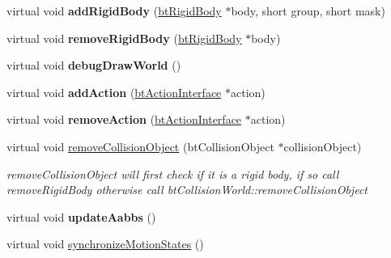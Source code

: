 \begin{DoxyCompactItemize}
\item 
\mbox{\label{classbtSimpleDynamicsWorld_a9ea7739dd5c2b5f5f114440b0741ed43}} 
virtual void {\bfseries add\+Rigid\+Body} (\hyperlink{classbtRigidBody}{bt\+Rigid\+Body} $\ast$body, short group, short mask)
\item 
\mbox{\label{classbtSimpleDynamicsWorld_ab6034d6e27ccee6a279e695d87586795}} 
virtual void {\bfseries remove\+Rigid\+Body} (\hyperlink{classbtRigidBody}{bt\+Rigid\+Body} $\ast$body)
\item 
\mbox{\label{classbtSimpleDynamicsWorld_aa9a10982644f81b5a8a27420611ba41a}} 
virtual void {\bfseries debug\+Draw\+World} ()
\item 
\mbox{\label{classbtSimpleDynamicsWorld_ae5edd46b00db8cbb67bd3b4b6b230e2b}} 
virtual void {\bfseries add\+Action} (\hyperlink{classbtActionInterface}{bt\+Action\+Interface} $\ast$action)
\item 
\mbox{\label{classbtSimpleDynamicsWorld_a9ef9438d5a167b5a84f6f0562cd8dbe9}} 
virtual void {\bfseries remove\+Action} (\hyperlink{classbtActionInterface}{bt\+Action\+Interface} $\ast$action)
\item 
\mbox{\label{classbtSimpleDynamicsWorld_a7c9255653135c9117d6a27738a3077ab}} 
virtual void \hyperlink{classbtSimpleDynamicsWorld_a7c9255653135c9117d6a27738a3077ab}{remove\+Collision\+Object} (bt\+Collision\+Object $\ast$collision\+Object)
\begin{DoxyCompactList}\small\item\em remove\+Collision\+Object will first check if it is a rigid body, if so call remove\+Rigid\+Body otherwise call bt\+Collision\+World\+::remove\+Collision\+Object \end{DoxyCompactList}\item 
\mbox{\label{classbtSimpleDynamicsWorld_a861597935f53ccc9cc1c4a7cd0c95240}} 
virtual void {\bfseries update\+Aabbs} ()
\item 
virtual void \hyperlink{classbtSimpleDynamicsWorld_a91e996f5ce6e465e805565ee0ba14824}{synchronize\+Motion\+States} ()
\item 

\end{DoxyCompactItemize}
